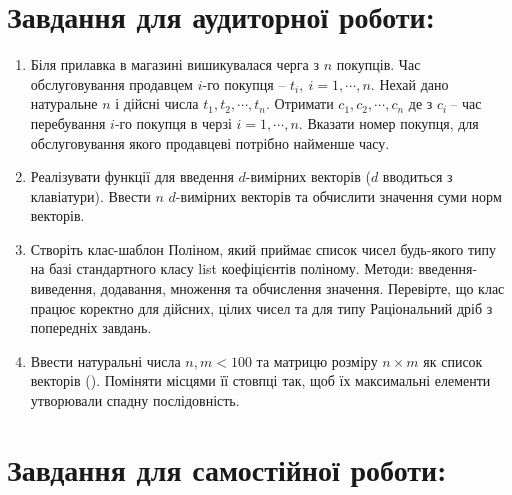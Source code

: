\documentclass[a5paper,titlepage,openany,twoside,
]
{book_unv}%
\begin{document}
\section{Завдання для аудиторної роботи:}

\begin{enumerate}
\def\labelenumi{\arabic{enumi})}

\item
  Біля прилавка в магазині вишикувалася черга з $n$ покупців. Час
  обслуговування продавцем $i$-го покупця  --
  \(t_{i},\ i = 1,\cdots,n\). Нехай дано натуральне $n$ і дійсні числа
  \(t_{1},t_{2},\cdots,t_{n}\). Отримати \(c_{1},c_{2},\cdots,c_{n}\) де
  з \(c_{i}\ \)-- час перебування $i$-го покупця в черзі
  \(i = 1,\cdots,n\). Вказати номер покупця, для обслуговування якого
  продавцеві потрібно найменше часу.
\item
Реалізувати функції для введення $d$-вимірних векторів
($d$ вводиться з клавіатури). Ввести $n$ $d$-вимірних векторів
 та обчислити значення суми норм векторів.

\item
  Створіть клас-шаблон Поліном, який приймає список чисел будь-якого
  типу на базі стандартного класу list коефіцієнтів
  поліному. Методи: введення-виведення, додавання, множення та
  обчислення значення. Перевірте, що клас працює коректно для дійсних,
  цілих чисел та для типу Раціональний дріб з попередніх завдань.
\item
Ввести натуральні числа $n,m<100$ та матрицю розміру $n \times m$ як
 список векторів (). Поміняти місцями її стовпці так, щоб їх
  максимальні елементи утворювали спадну послідовність.
\end{enumerate}

\section{Завдання для самостійної роботи:}
\end{document}
